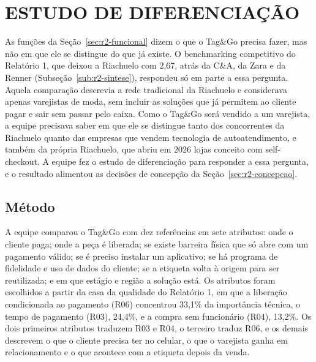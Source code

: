 
\section{ESTUDO DE DIFERENCIAÇÃO}
\label{sec:r2-diferenciacao}

As funções da Seção~\ref{sec:r2-funcional} dizem o que o Tag\&Go precisa fazer, mas não em que ele se distingue do que já existe. O benchmarking competitivo do Relatório 1, que deixou a Riachuelo com 2,67, atrás da C\&A, da Zara e da Renner (Subseção~\ref{sub:r2-sintese}), respondeu só em parte a essa pergunta. Aquela comparação descrevia a rede tradicional da Riachuelo e considerava apenas varejistas de moda, sem incluir as soluções que já permitem ao cliente pagar e sair sem passar pelo caixa. Como o Tag\&Go será vendido a um varejista, a equipe precisava saber em que ele se distingue tanto dos concorrentes da Riachuelo quanto das empresas que vendem tecnologia de autoatendimento, e também da própria Riachuelo, que abriu em 2026 lojas conceito com self-checkout. A equipe fez o estudo de diferenciação para responder a essa pergunta, e o resultado alimentou as decisões de concepção da Seção~\ref{sec:r2-concepcao}.

\subsection{Método}
\label{sub:r2-dif-metodo}

A equipe comparou o Tag\&Go com dez referências em sete atributos: onde o cliente paga; onde a peça é liberada; se existe barreira física que só abre com um pagamento válido; se é preciso instalar um aplicativo; se há programa de fidelidade e uso de dados do cliente; se a etiqueta volta à origem para ser reutilizada; e em que estágio e região a solução está. Os atributos foram escolhidos a partir da casa da qualidade do Relatório 1, em que a liberação condicionada ao pagamento (R06) concentrou 33,1\% da importância técnica, o tempo de pagamento (R03), 24,4\%, e a compra sem funcionário (R04), 13,2\%. Os dois primeiros atributos traduzem R03 e R04, o terceiro traduz R06, e os demais descrevem o que o cliente precisa ter no celular, o que o varejista ganha em relacionamento e o que acontece com a etiqueta depois da venda.


